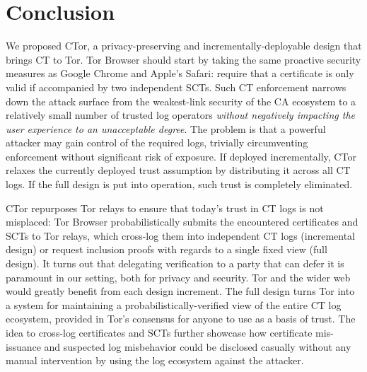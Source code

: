 \section{Conclusion} \label{sec:conclusion} 
We proposed CTor, a privacy-preserving and incrementally-deployable design that
brings CT to Tor.  Tor Browser should start by taking the same proactive
security measures as Google Chrome and Apple's Safari:
	require that a certificate is only valid if accompanied by two
	independent SCTs.
Such CT enforcement narrows down the attack surface from the weakest-link
security of the CA ecosystem to a relatively small number of trusted log
operators \emph{without negatively impacting the user experience to an
unacceptable degree}.  The problem is that a powerful attacker may gain control
of the required logs, trivially circumventing enforcement without significant
risk of exposure.  If deployed incrementally, CTor relaxes the currently
deployed trust assumption by distributing it across all CT logs.  If the full
design is put into operation, such trust is completely eliminated.

CTor repurposes Tor relays to ensure that today's trust in CT logs is not
misplaced:
	Tor Browser probabilistically submits the encountered certificates and SCTs
	to Tor relays, which
		cross-log them into independent CT logs (incremental design)
		or request inclusion proofs with regards to a single fixed view
			(full design).
It turns out that delegating verification to a party that can defer it
is paramount in our setting, both for privacy and security.  Tor and the wider
web would greatly benefit from each design increment.  The full design turns Tor
into a
system for maintaining a probabilistically-verified view of the entire CT log
ecosystem, provided in Tor's consensus for anyone to use as a basis of trust.
The idea to cross-log certificates and SCTs further showcase how certificate
mis-issuance and suspected log misbehavior could be disclosed casually without
any manual intervention by using the log ecosystem against the attacker.
%
%

